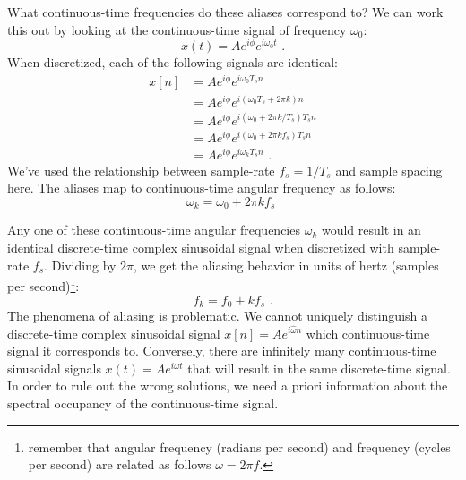 What continuous-time frequencies do these aliases correspond to? We
can work this out by looking at the continuous-time signal of
frequency $\omega_0$:
\begin{equation}
  x(t) = A e^{i\phi} e^{i\omega_0 t}\,\,.
\end{equation}
When discretized, each of the following signals are identical:
\begin{align}
  x[n] &=A e^{i\phi} e^{i \omega_0 T_s n }\\
 &= A e^{i\phi} e^{i(\omega_0 T_s + 2\pi k) n }\\
  &= A e^{i\phi} e^{i(\omega_0 + 2\pi k/T_s) T_s n }  \\
    &= A e^{i\phi} e^{i(\omega_0 + 2\pi k f_s) T_s n }  \\
    &= A e^{i\phi} e^{i \omega_k T_s n } \,\,.
\end{align}
We've used the relationship between sample-rate $f_s=1/T_s$ and sample
spacing here. The aliases map to continuous-time angular frequency as
follows:
\begin{equation}
  \boxed{
    \omega_k = \omega_0 + 2\pi k f_s
    }\,\,
\end{equation}

Any one of these continuous-time angular frequencies $\omega_k$ would
result in an identical discrete-time complex sinusoidal signal when
discretized with sample-rate $f_s$. Dividing by
$2\pi$, we get the aliasing behavior in units of hertz (samples per
second)\footnote{remember that angular frequency (radians per second)
  and frequency (cycles per second) are related as follows $\omega = 2\pi
  f$.}:
\begin{equation}
  \boxed{
    f_k = f_0 + k f_s
    }\,\,.
\end{equation}
The phenomena of aliasing is problematic. We cannot uniquely distinguish
a discrete-time complex sinusoidal signal $x[n]=Ae^{i\hat{\omega}n}$ 
which continuous-time signal it corresponds to. Conversely,
there are infinitely many continuous-time sinusoidal signals
$x(t)=Ae^{i\omega t}$ that will result in the same discrete-time
signal. In order to rule out the wrong solutions, we need a priori
information about the spectral occupancy of the continuous-time
signal.

